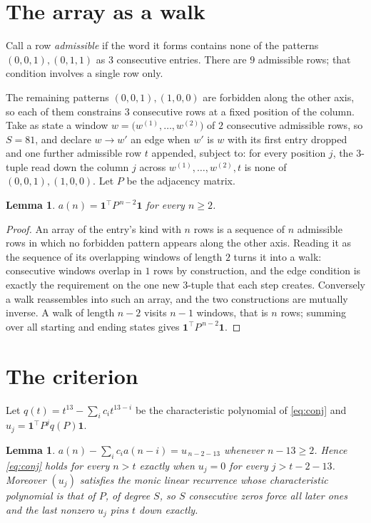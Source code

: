 \documentclass[11pt,a4paper]{article}
\theoremstyle{plain}
\newtheorem{lemma}[theorem]{Lemma}
\theoremstyle{definition}
\begin{document}
\section{The array as a walk}

Call a row \emph{admissible} if the word it forms contains none of the patterns
$(0,0,1), (0,1,1)$ as $3$ consecutive entries. There are $9$ admissible rows; that condition
involves a single row only.

The remaining patterns $(0,0,1), (1,0,0)$ are forbidden along the other axis, so each of them
constrains $3$ consecutive rows at a fixed position of the column. Take as state a
window $w=\bigl(w^{(1)},\dots,w^{(2)}\bigr)$ of $2$ consecutive admissible
rows, so $S=81$, and declare $w\to w'$ an edge when $w'$ is $w$ with its first entry
dropped and one further admissible row $t$ appended, subject to: for every position
$j$, the $3$-tuple read down the column $j$ across $w^{(1)},\dots,w^{(2)},t$
is none of $(0,0,1), (1,0,0)$. Let $P$ be the adjacency matrix.

\begin{lemma}\label{lem:walk}
$a(n)=\mathbf{1}^{\!\top}P^{\,n-2}\mathbf{1}$ for every $n\ge2$.
\end{lemma}

\begin{proof}
An array of the entry's kind with $n$ rows is a sequence of $n$ admissible rows in
which no forbidden pattern appears along the other axis. Reading it as the sequence of its
overlapping windows of length $2$ turns it into a walk: consecutive windows overlap in
$1$ rows by construction, and the edge condition is exactly the requirement on the one
new $3$-tuple that each step creates. Conversely a walk reassembles into such an array,
and the two constructions are mutually inverse. A walk of length $n-2$ visits $n-1$
windows, that is $n$ rows; summing over all starting and ending states gives
$\mathbf{1}^{\!\top}P^{\,n-2}\mathbf{1}$.
\end{proof}

\section{The criterion}

Let $q(t)=t^{13}-\sum_i c_i t^{13-i}$ be the characteristic polynomial of
\eqref{eq:conj} and $u_j=\mathbf{1}^{\!\top}P^{j}q(P)\mathbf{1}$.

\begin{lemma}\label{lem:crit}
$a(n)-\sum_i c_i a(n-i)=u_{\,n-2-13}$ whenever $n-13\ge2$. Hence
\eqref{eq:conj} holds for every $n>t$ exactly when $u_j=0$ for every
$j>t-2-13$. Moreover $(u_j)$ satisfies the monic linear recurrence whose
characteristic polynomial is that of $P$, of degree $S$, so $S$ consecutive zeros force all
later ones and the last nonzero $u_j$ pins $t$ down exactly.
\end{lemma}
\end{document}
